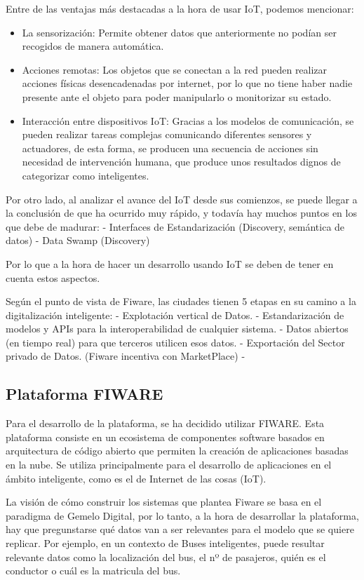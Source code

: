 \documentclass[12pt, a4paper, twoside]{article}
\begin{document}
Entre de las ventajas más destacadas a la hora de usar IoT, podemos mencionar:
\begin{itemize}
    \item La sensorización: Permite obtener datos que anteriormente no podían ser recogidos de manera automática.
    \item Acciones remotas: Los objetos que se conectan a la red pueden realizar acciones físicas desencadenadas por internet,
      por lo que no tiene haber nadie presente ante el objeto para poder manipularlo o monitorizar su estado.
    \item Interacción entre dispositivos IoT: Gracias a los modelos de comunicación, se pueden realizar tareas complejas
      comunicando diferentes sensores y actuadores, de esta forma, se producen una secuencia de acciones sin necesidad
      de intervención humana, que produce unos resultados dignos de categorizar como inteligentes.
\end{itemize}


Por otro lado, al analizar el avance del IoT desde sus comienzos, se puede llegar a la conclusión 
de que ha ocurrido muy rápido, y todavía hay muchos puntos en los que debe de madurar:
- Interfaces de Estandarización (Discovery, semántica de datos)
- Data Swamp (Discovery)

Por lo que a la hora de hacer un desarrollo usando IoT se deben de tener en cuenta estos aspectos.


Según el punto de vista de Fiware, las ciudades tienen 5 etapas en su camino a la digitalización inteligente:
- Explotación vertical de Datos.
- Estandarización de modelos y APIs para la interoperabilidad de cualquier sistema.
- Datos abiertos (en tiempo real) para que terceros utilicen esos datos.
- Exportación del Sector privado de Datos. (Fiware incentiva con MarketPlace)
-



\subsection{Plataforma FIWARE} 
Para el desarrollo de la plataforma, se ha decidido utilizar FIWARE.
Esta plataforma consiste en un ecosistema de componentes software basados en arquitectura
de código abierto que permiten la creación de aplicaciones basadas en la nube. Se utiliza 
principalmente para el desarrollo de aplicaciones en el ámbito inteligente, como es el de 
Internet de las cosas (IoT).

La visión de cómo construir los sistemas que plantea Fiware se basa en el paradigma de Gemelo Digital,
por lo tanto, a la hora de desarrollar la plataforma, hay que pregunstarse qué datos van a 
ser relevantes para el modelo que se quiere replicar. Por ejemplo, en un contexto de 
Buses inteligentes, puede resultar relevante datos como la localización del bus, 
el nº de pasajeros, quién es el conductor o cuál es la matricula del bus.
\end{document}
